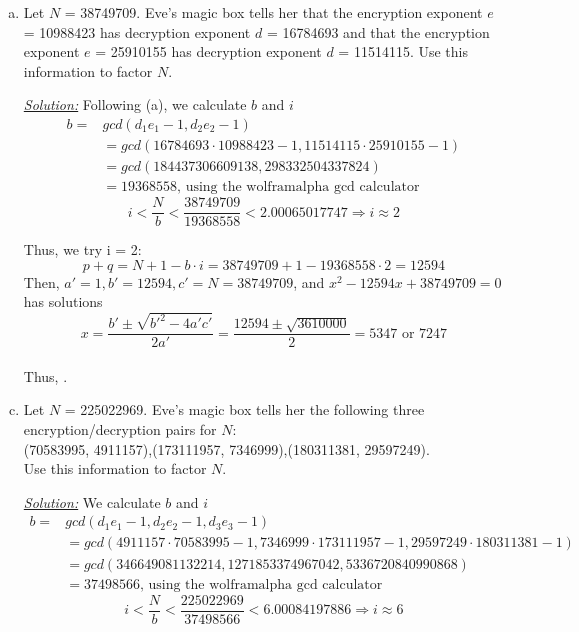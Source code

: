 \documentclass[12pt]{article}
\begin{document}
\begin{enumerate}[a)]
  
  
  
  \item Let $N$ = 38749709. Eve's magic box tells her that the encryption exponent $e$ = 10988423 has decryption exponent $d$ = 16784693 and that the encryption exponent $e$ = 25910155 has decryption exponent $d$ = 11514115. Use this information to factor $N$.
  
  \color{blue}
  \item[\underline{\textit{Solution:}}] Following (a), we calculate $b$ and $i$
  \begin{align*}
  b=&gcd(d_{1}e_{1}-1, d_{2}e_{2}-1)\\
  &=gcd(16784693\cdot10988423-1, 11514115\cdot25910155-1)\\
  &=gcd(184437306609138, 298332504337824)\\
  &=19368558\text{, using the wolframalpha gcd calculator}
  \end{align*}
  $$i < \frac{N}{b} < \frac{38749709}{19368558} < 2.00065017747 \Rightarrow i \approx 2$$
  
  Thus, we try i = 2:
  $$p+q=N+1-b \cdot i=38749709+1-19368558\cdot2=12594$$
  Then, $a'=1,b'=12594,c'=N=38749709$, and $x^{2}-12594x+38749709=0$ has solutions \\
  $$x=\frac{b'\pm\sqrt{b'^{2}-4a'c'}}{2a'}=\frac{12594\pm\sqrt{3610000}}{2}= 5347 \text{ or } 7247$$\\
  
  Thus, .
  \color{black}
  \pagebreak




  \item Let $N$ = 225022969. Eve's magic box tells her the following three encryption/decryption pairs for $N$:\\
  (70583995, 4911157),\hfill(173111957, 7346999),\hfill(180311381, 29597249).\\
  Use this information to factor $N$.
  
  \color{blue}
  \item[\underline{\textit{Solution:}}] We calculate $b$ and $i$
  \begin{align*}
  b=&gcd(d_{1}e_{1}-1, d_{2}e_{2}-1, d_{3}e_{3}-1)\\
  &=gcd(4911157\cdot70583995-1, 7346999\cdot173111957-1, 29597249\cdot180311381-1)\\
  &=gcd(346649081132214, 1271853374967042, 5336720840990868)\\
  &=37498566\text{, using the wolframalpha gcd calculator}
  \end{align*}
   $$i < \frac{N}{b} < \frac{225022969}{37498566} < 6.00084197886 \Rightarrow i \approx 6$$\\
  

\end{enumerate}
\end{document}
